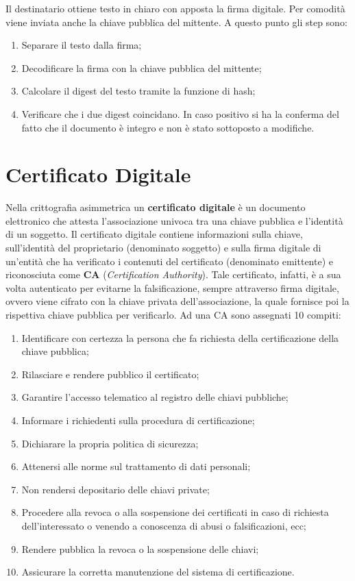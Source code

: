 Il destinatario ottiene testo in chiaro con apposta la firma digitale.
Per comodità viene inviata anche la chiave pubblica del mittente. A
questo punto gli step sono:

\begin{enumerate}
    \item Separare il testo dalla firma;
    \item Decodificare la firma con la chiave pubblica del mittente;
    \item Calcolare il digest del testo tramite la funzione di hash;
    \item Verificare che i due digest coincidano. In caso positivo si ha
          la conferma del fatto che il documento è integro e non è stato
          sottoposto a modifiche.
\end{enumerate}

\section{Certificato Digitale}

Nella crittografia asimmetrica un \textbf{certificato digitale} è un
documento elettronico che attesta
l'associazione univoca tra una chiave pubblica e l'identità di un soggetto.
Il certificato digitale contiene informazioni sulla chiave,
sull'identità del proprietario
(denominato soggetto) e sulla firma digitale di un'entità che ha verificato
i contenuti del certificato
(denominato emittente) e riconosciuta come \textbf{CA}
(\textit{Certification Authority}).
Tale certificato, infatti, è
a sua volta autenticato per evitarne la falsificazione, sempre attraverso
firma digitale, ovvero viene
cifrato con la chiave privata dell'associazione, la quale fornisce poi la
rispettiva chiave pubblica per
verificarlo.
Ad una CA sono assegnati 10 compiti:
\begin{enumerate}
    \item Identificare con certezza la persona che fa richiesta della certificazione della chiave
          pubblica;
    \item Rilasciare e rendere pubblico il certificato;
    \item Garantire l'accesso telematico al registro delle chiavi pubbliche;
    \item Informare i richiedenti sulla procedura di certificazione;
    \item Dichiarare la propria politica di sicurezza;
    \item Attenersi alle norme sul trattamento di dati personali;
    \item Non rendersi depositario delle chiavi private;
    \item Procedere alla revoca o alla sospensione dei certificati in caso di richiesta dell'interessato o
          venendo a conoscenza di abusi o falsificazioni, ecc;
    \item Rendere pubblica la revoca o la sospensione delle chiavi;
    \item Assicurare la corretta manutenzione del sistema di certificazione.
\end{enumerate}

